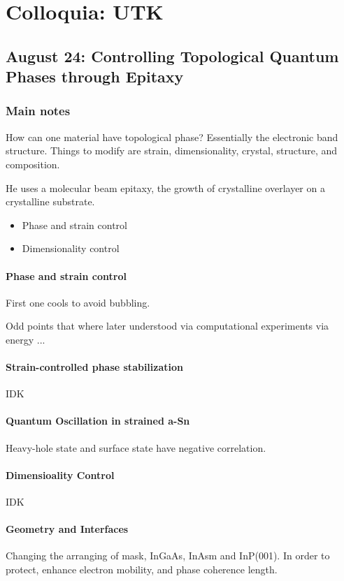\chapter{Colloquia: UTK}

\section{August 24: Controlling Topological Quantum Phases through Epitaxy}

\subsection{Main notes}
How can one material have topological phase? Essentially the electronic band structure. Things to modify are strain, dimensionality, crystal, structure, and composition.

He uses a molecular beam epitaxy, the growth of crystalline overlayer on a crystalline substrate.
\begin{itemize}
	\item Phase and strain control
  \item Dimensionality control
\end{itemize}
\subsubsection{Phase and strain control}

First one cools to avoid bubbling.

Odd points that where later understood via computational experiments via energy ...
\subsubsection{Strain-controlled phase stabilization}
IDK

\subsubsection{Quantum Oscillation in strained a-Sn}

Heavy-hole state and surface state have negative correlation.

\subsubsection{Dimensioality Control}
IDK
\subsubsection{Geometry and Interfaces}
Changing the arranging of mask, InGaAs, InAsm and InP(001). In order to protect, enhance electron mobility, and phase coherence length.

